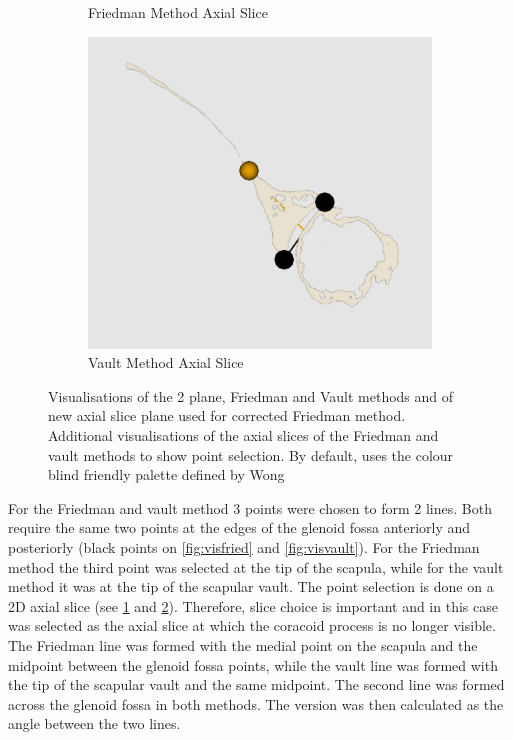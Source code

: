 \begin{figure}
\begin{center}
\begin{subfigure}[b]{0.30\linewidth}
			\caption{\label{fig:visfried2D}Friedman Method Axial Slice}
		\end{subfigure}	
                \begin{subfigure}[b]{0.30\linewidth}
			\includegraphics[width=\linewidth]{figures/vault_vis2D.png}
			\caption{\label{fig:visvault2D}Vault Method Axial Slice}
		\end{subfigure}	
	\end{center}
	\caption{\label{fig:visualisations}Visualisations of the 2 plane, Friedman and Vault methods and of new axial slice plane used for corrected Friedman method. Additional visualisations of the axial slices of the Friedman and vault methods to show point selection. By default, \sksglenoid uses the colour blind friendly palette defined by Wong\cite{bang2011}}
\end{figure}

For the Friedman and vault method 3 points were chosen to form 2 lines. Both require the same two points at the edges of the glenoid fossa anteriorly and posteriorly (black points on \ref{fig:visfried} and \ref{fig:visvault}). For the Friedman method the third point was selected at the tip of the scapula, while for the vault method it was at the tip of the scapular vault. The point selection is done on a 2D axial slice (see \ref{fig:visfried2D} and \ref{fig:visvault2D}). Therefore, slice choice is important and in this case was selected as the axial slice at which the coracoid process is no longer visible. The Friedman line was formed with the medial point on the scapula and the midpoint between the glenoid fossa points, while the vault line was formed with the tip of the scapular vault and the same midpoint. The second line was formed across the glenoid fossa in both methods. The version was then calculated as the angle between the two lines. 

